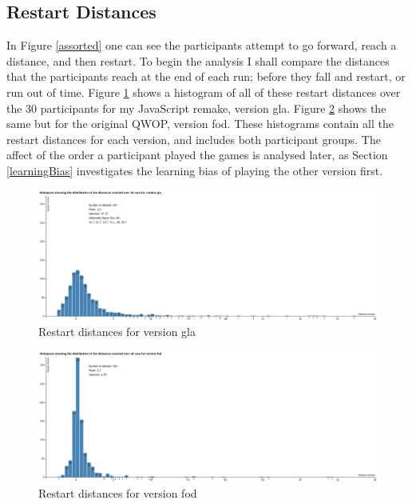 \documentclass[12pt,a4paper,twoside,openright]{report}
\begin{document}
\subsection{Restart Distances}
\label{restartDistances}

In Figure \ref{assorted} one can see the participants attempt to go forward, reach a distance, and then restart. 
To begin the analysis I shall compare the distances that the participants reach at the end of each run; before they fall and restart, or run out of time.
Figure \ref{glaRestarts} shows a histogram of all of these restart distances over the 30 participants for my JavaScript remake, version gla. Figure \ref{fodRestarts} shows the same but for the original QWOP, version fod.
These histograms contain all the restart distances for each version, and includes both participant groups.
The affect of the order a participant played the games is analysed later, as Section \ref{learningBias} investigates the learning bias of playing the other version first.

\begin{figure}[tbh]
\centerline{\includegraphics[scale=0.39]{glaRestarts.PNG}}
\caption{Restart distances for version gla}
\label{glaRestarts}
\end{figure}

\begin{figure}[tbh]
\centerline{\includegraphics[scale=0.39]{fodRestarts.PNG}}
\caption{Restart distances for version fod}
\label{fodRestarts}
\end{figure}
\end{document}
